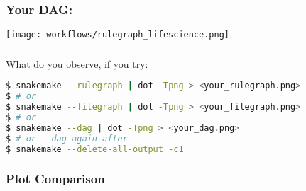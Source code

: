 \begin{frame}
  \frametitle{Your DAG:}
  \centering
  \texttt{[image: workflows/rulegraph\_lifescience.png]}
\end{frame}

\begin{frame}[fragile]
  \frametitle{}
  What do you observe, if you try:
  \begin{lstlisting}[language=Bash, style=Shell,basicstyle=\footnotesize]
$ snakemake --rulegraph | dot -Tpng > <your_rulegraph.png>
$ # or
$ snakemake --filegraph | dot -Tpng > <your_filegraph.png>
$ # or
$ snakemake --dag | dot -Tpng > <your_dag.png>
$ # or --dag again after
$ snakemake --delete-all-output -c1
  \end{lstlisting}
\end{frame}

\begin{frame}[fragile]
 \frametitle{Plot Comparison}
 \begin{figure}
  \centering
\end{figure}

\end{frame}




